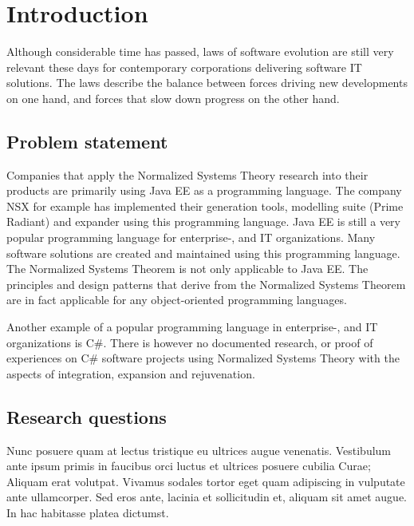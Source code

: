 \chapter{Introduction} \label{introduction}

Although considerable time has passed, \citeauthor{lehman_programs_1980} laws of software
evolution \cite{lehman_programs_1980} are still very relevant these days for contemporary
corporations delivering software IT solutions. The laws describe the balance between
forces driving new developments on one hand, and forces that slow down progress on the
other hand. 




\section{Problem statement} \label{problem_statement}
Companies that apply the Normalized Systems Theory research into their products are
primarily using Java EE as a programming language. The company NSX for example has
implemented their generation tools, modelling suite (Prime Radiant) and expander using
this programming language. Java EE is still a very popular programming language for
enterprise-, and IT organizations. Many software solutions are created and maintained
using this programming language. The Normalized Systems Theorem is not only applicable to
Java EE. The principles and design patterns that derive from the Normalized Systems
Theorem are in fact applicable for any object-oriented programming languages. 

Another example of a popular programming language in enterprise-, and IT organizations is
C\#. There is however no documented research, or proof of experiences on C\# software
projects using Normalized Systems Theory with the aspects of integration, expansion and
rejuvenation.





\section{Research questions} \label{ResearchQuestions}

Nunc posuere quam at lectus tristique eu ultrices augue venenatis. Vestibulum ante ipsum
primis in faucibus orci luctus et ultrices posuere cubilia Curae; Aliquam erat volutpat.
Vivamus sodales tortor eget quam adipiscing in vulputate ante ullamcorper. Sed eros ante,
lacinia et sollicitudin et, aliquam sit amet augue. In hac habitasse platea dictumst.